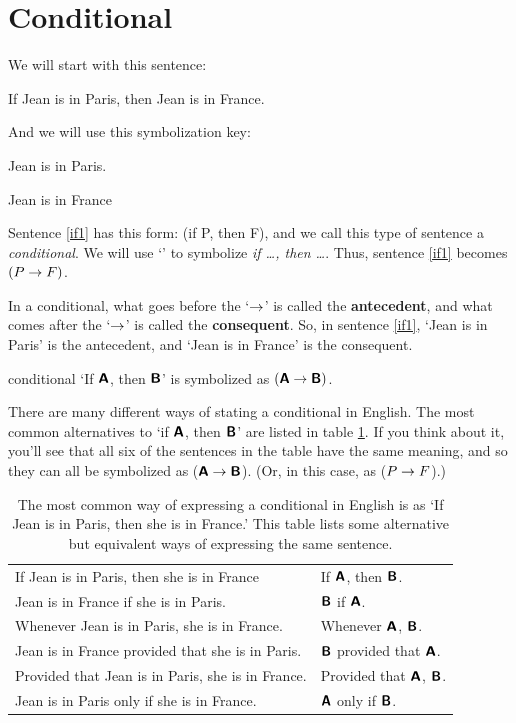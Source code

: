 \section{Conditional}

We will start with this sentence:
	\begin{earg}
		\item[\ex{if1}] If Jean is in Paris, then Jean is in France.
	\end{earg}
And we will use this symbolization key:
	\begin{ekey}
		\item[P] Jean is in Paris.
		\item[F] Jean is in France
	\end{ekey}
Sentence \ref{if1} has this form: (if P, then F), and we call this type of sentence a \textit{conditional}. We will use `\eif' to symbolize \textit{if \ldots, then \ldots}. Thus, sentence \ref{if1} becomes $(P\rightarrow F)$. 

In a conditional, what goes before the `$\rightarrow$'  is called the \textbf{antecedent}, and what comes after the `$\rightarrow$' is called the \textbf{consequent}. So, in sentence \ref{if1}, `Jean is in Paris' is the antecedent, and `Jean is in France' is the consequent.

\begin{factboxy}{conditional}
`If $\bm{\mathsf{A}}$, then $\bm{\mathsf{B}}$' is symbolized as $(\bm{\mathsf{A}} \rightarrow \bm{\mathsf{B}})$.
\end{factboxy}

There are many different ways of stating a conditional in English. The most common alternatives to `if $\bm{\mathsf{A}}$, then $\bm{\mathsf{B}}$' are listed in table \ref{table.conditional.English}. If you think about it, you'll see that all six of the sentences in the table have the same meaning, and so they can all be symbolized as ($\bm{\mathsf{A}} \rightarrow \bm{\mathsf{B}}$). (Or, in this case, as ($P \rightarrow F$).)


\begin{table}[h]\centering\sffamily\footnotesize
{}
\begin{tabular}{@{}l l@{}}\toprule
If Jean is in Paris, then she is in France & If $\bm{\mathsf{A}}$, then $\bm{\mathsf{B}}$.\\
Jean is in France if she is in Paris. 	&	$\bm{\mathsf{B}}$ if $\bm{\mathsf{A}}$.\\
Whenever Jean is in Paris, she is in France.  	&	Whenever $\bm{\mathsf{A}}$, $\bm{\mathsf{B}}$.\\
Jean is in France provided that she is in Paris. 	&	$\bm{\mathsf{B}}$ provided that $\bm{\mathsf{A}}$.\\
Provided that Jean is in Paris, she is in France. 	&	Provided that $\bm{\mathsf{A}}$, $\bm{\mathsf{B}}$.\\
Jean is in Paris only if she is in France. 	&	$\bm{\mathsf{A}}$ only if $\bm{\mathsf{B}}$.\\
\bottomrule
\end{tabular}
\caption{The most common way of expressing a conditional in English is as `If Jean is in Paris, then she is in France.' This table lists some alternative but equivalent ways of expressing the same sentence.}\label{table.conditional.English}
\end{table}


